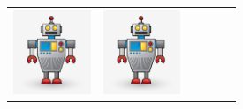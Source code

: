 \documentclass[a4paper, landscape]{article}
\newcommand{\picHeight}{1in}
\begin{document}
\begin{tabular}{| c | c | c | c | c | c |}
            \includegraphics[height=\picHeight]{robot-character.jpg} &
            \includegraphics[height=\picHeight]{robot-character.jpg} &

\end{tabular}
\end{document}

